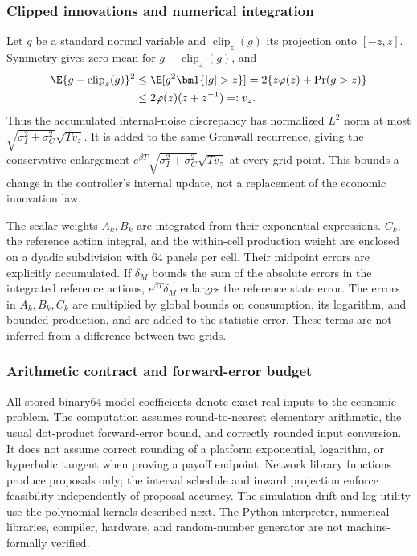 \subsubsection{Clipped innovations and numerical integration}
Let $g$ be a standard normal variable and $\operatorname{clip}_z(g)$ its projection onto $[-z,z]$. Symmetry gives zero mean for $g-\operatorname{clip}_z(g)$, and
\[
 \begin{aligned}\E\{g-\operatorname{clip}_z(g)\}^2
 &\leq \E[g^2\bm1\{|g|>z\}]
 =2\{z\varphi(z)+\Pr(g>z)\}\\
 &\leq2\varphi(z)(z+z^{-1})=:v_z.\end{aligned}
\]
Thus the accumulated internal-noise discrepancy has normalized $L^2$ norm at most
$\sqrt{\sigma_I^2+\sigma_C^2}\sqrt{Tv_z}$.
It is added to the same Gronwall recurrence, giving the conservative enlargement
$e^{\beta T}\sqrt{\sigma_I^2+\sigma_C^2}\sqrt{Tv_z}$ at every grid point. This bounds a change in the controller's internal update, not a replacement of the economic innovation law.

The scalar weights $A_k,B_k$ are integrated from their exponential expressions. $C_k$, the reference action integral, and the within-cell production weight are enclosed on a dyadic subdivision with 64 panels per cell. Their midpoint errors are explicitly accumulated. If $\delta_M$ bounds the sum of the absolute errors in the integrated reference actions, $e^{\beta T}\delta_M$ enlarges the reference state error. The errors in $A_k,B_k,C_k$ are multiplied by global bounds on consumption, its logarithm, and bounded production, and are added to the statistic error. These terms are not inferred from a difference between two grids.

\subsubsection{Arithmetic contract and forward-error budget}\label{app:r11arithmetic}
All stored binary64 model coefficients denote exact real inputs to the economic problem. The computation assumes round-to-nearest elementary arithmetic, the usual dot-product forward-error bound, and correctly rounded input conversion. It does not assume correct rounding of a platform exponential, logarithm, or hyperbolic tangent when proving a payoff endpoint. Network library functions produce proposals only; the interval schedule and inward projection enforce feasibility independently of proposal accuracy. The simulation drift and log utility use the polynomial kernels described next. The Python interpreter, numerical libraries, compiler, hardware, and random-number generator are not machine-formally verified.

